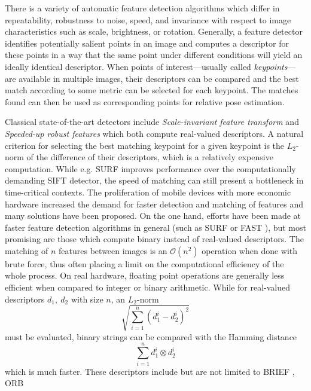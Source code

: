 There is a variety of automatic feature detection algorithms which differ in
repeatability, robustness to noise, speed, and invariance with respect to image
characteristics such as scale, brightness, or rotation. 
Generally, a feature detector identifies potentially salient points in an image
and computes a descriptor for these points in a way that the same point under
different conditions will yield an ideally identical descriptor. When points of
interest---usually called \emph{keypoints}---are available in multiple images,
their descriptors can be compared and the best match according to some metric
can be selected for each keypoint. The matches found can then be used as
corresponding points for relative pose estimation.

\sloppypar
Classical state-of-the-art detectors include \emph{Scale-invariant feature
transform} \citep{lowe1999} and \emph{Speeded-up robust features}
\citep{bay2006} which both compute real-valued descriptors. A natural criterion
for selecting the best matching keypoint for a given keypoint is the $L_2$-norm
of the difference of their descriptors, which is a relatively expensive
computation. While e.g. SURF improves performance over the computationally
demanding SIFT detector, the speed of matching can still present a bottleneck in
time-critical contexts. The proliferation of mobile devices with more economic
hardware increased the demand for faster detection and matching of features and
many solutions have been proposed. On the one hand, efforts have been made at
faster feature detection algorithms in general (such as SURF or FAST
\citep{rosten2005}), but most promising are those which compute binary instead
of real-valued descriptors. The matching of $n$ features between images is an
$\mathcal{O}(n^2)$ operation when done with brute force, thus often placing a
limit on the computational efficiency of the whole process. On real hardware,
floating point operations are generally less efficient when compared to integer
or binary arithmetic. While for real-valued descriptors $d_1,~d_2$ with size $n$,
an $L_2$-norm 
\begin{equation*}
   \sqrt{\sum_{i=1}^n (d_1^i - d_2^i)^2}
\end{equation*}
must be evaluated,
binary strings can be compared with the Hamming distance 
\begin{equation*}
   \sum_{i=1}^n d_1^i \otimes d_2^i   
\end{equation*}
which is much faster. These descriptors include but are not limited to BRIEF
\citep[Binary Robust Independent Elementary Features]{calonder2010}, ORB
